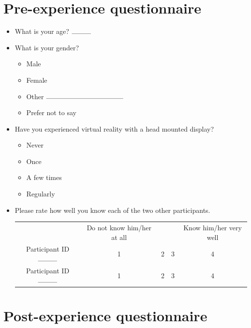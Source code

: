 \documentclass[]{simple-thesis}
\begin{document}
\begin{appendices}


\chapter{Pre-experience questionnaire}\label{appendix:questionnaire:pre}

\begin{itemize}

\item What is your age? $\rule{1cm}{0.1mm}$

\item What is your gender?

\begin{itemize}
  \item Male
  \item Female
  \item Other $\rule{4cm}{0.1mm}$
  \item Prefer not to say
\end{itemize}

\item Have you experienced virtual reality with a head mounted display?

\begin{itemize}
  \item Never
  \item Once
  \item A few times
  \item Regularly
\end{itemize}

\item Please rate how well you know each of the two other participants.

\begin{tabular}{c|C C C C}
  & Do not know him/her at all & & & Know him/her very well \\
  Participant ID $\rule{1cm}{0.1mm}$ & 1 & 2 & 3 & 4 \\
  Participant ID $\rule{1cm}{0.1mm}$ & 1 & 2 & 3 & 4 \\
\end{tabular}

\end{itemize}


\chapter{Post-experience questionnaire}\label{appendix:questionnaire:post}


\end{appendices}
\end{document}

